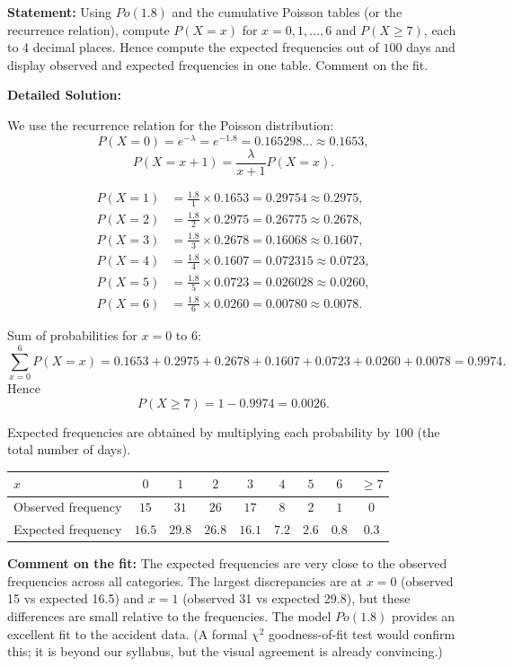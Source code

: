 \documentclass[11pt]{article}
\begin{document}
\begin{exoresolu}
\textbf{Statement:} Using $Po(1.8)$ and the cumulative Poisson tables (or the recurrence relation), compute $P(X=x)$ for $x = 0, 1, \dots, 6$ and $P(X \geq 7)$, each to 4 decimal places. Hence compute the expected frequencies out of $100$ days and display observed and expected frequencies in one table. Comment on the fit.

\tcblower
\textbf{Detailed Solution:}

We use the recurrence relation for the Poisson distribution:
\[
P(X=0) = e^{-\lambda} = e^{-1.8} = 0.165298\ldots \approx 0.1653,
\]
\[
P(X=x+1) = \frac{\lambda}{x+1} P(X=x).
\]

\begin{align*}
P(X=1) &= \frac{1.8}{1} \times 0.1653 = 0.29754 \approx 0.2975,\\
P(X=2) &= \frac{1.8}{2} \times 0.2975 = 0.26775 \approx 0.2678,\\
P(X=3) &= \frac{1.8}{3} \times 0.2678 = 0.16068 \approx 0.1607,\\
P(X=4) &= \frac{1.8}{4} \times 0.1607 = 0.072315 \approx 0.0723,\\
P(X=5) &= \frac{1.8}{5} \times 0.0723 = 0.026028 \approx 0.0260,\\
P(X=6) &= \frac{1.8}{6} \times 0.0260 = 0.00780 \approx 0.0078.
\end{align*}

Sum of probabilities for $x=0$ to $6$:
\[
\sum_{x=0}^{6} P(X=x) = 0.1653 + 0.2975 + 0.2678 + 0.1607 + 0.0723 + 0.0260 + 0.0078 = 0.9974.
\]
Hence
\[
P(X \geq 7) = 1 - 0.9974 = 0.0026.
\]

Expected frequencies are obtained by multiplying each probability by $100$ (the total number of days).

\begin{center}
\begin{tabular}{|l|cccccccc|}
\hline
\rowcolor{popblueL} $x$ & $0$ & $1$ & $2$ & $3$ & $4$ & $5$ & $6$ & $\geq 7$ \\
\hline
Observed frequency & $15$ & $31$ & $26$ & $17$ & $8$ & $2$ & $1$ & $0$ \\
\hline
Expected frequency & $16.5$ & $29.8$ & $26.8$ & $16.1$ & $7.2$ & $2.6$ & $0.8$ & $0.3$ \\
\hline
\end{tabular}
\end{center}

\textbf{Comment on the fit:} The expected frequencies are very close to the observed frequencies across all categories. The largest discrepancies are at $x=0$ (observed 15 vs expected 16.5) and $x=1$ (observed 31 vs expected 29.8), but these differences are small relative to the frequencies. The model $Po(1.8)$ provides an excellent fit to the accident data. (A formal $\chi^2$ goodness-of-fit test would confirm this; it is beyond our syllabus, but the visual agreement is already convincing.)
\end{exoresolu}
\end{document}
